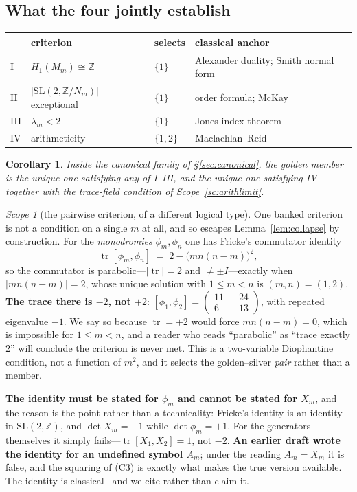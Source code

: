 \documentclass[11pt,reqno]{amsart}
\theoremstyle{plain}
\newtheorem{corollary}[theorem]{Corollary}
\theoremstyle{definition}
\theoremstyle{remark}
\newtheorem{scope}[theorem]{Scope}
\newcommand{\Z}{\mathbb{Z}}
\newcommand{\SL}{\mathrm{SL}}
\begin{document}
\subsection{What the four jointly establish}

\begin{table}[h]
\centering\small
\begin{tabular}{@{}llll@{}}
\toprule
 & criterion & selects & classical anchor\\
\midrule
I   & $H_1(M_m)\cong\Z$ & $\{1\}$ & Alexander duality; Smith normal form\\
II  & $|\SL(2,\Z/N_m)|$ exceptional & $\{1\}$ & order formula; McKay\\
III & $\lambda_m<2$ & $\{1\}$ & Jones index theorem\\
IV  & arithmeticity & $\{1,2\}$ & Maclachlan--Reid\\
\bottomrule
\end{tabular}
\end{table}

\begin{corollary}\label{cor:four}
Inside the canonical family of \S\ref{sec:canonical}, the golden member is the unique
one satisfying any of I--III, and the unique one satisfying IV together with the
trace-field condition of Scope~\ref{sc:arithlimit}.
\end{corollary}

\begin{scope}[the pairwise criterion, of a different logical type]\label{sc:pairwise}
One banked criterion is not a condition on a single $m$ at all, and so escapes
Lemma~\ref{lem:collapse} by construction. For the \emph{monodromies} $\phi_m,\phi_n$ one
has Fricke's commutator identity
\[
   \operatorname{tr}[\phi_m,\phi_n]\;=\;2-\bigl(mn(n-m)\bigr)^2 ,
\]
so the commutator is parabolic---$|\!\operatorname{tr}|=2$ and $\ne\pm I$---exactly when
$|mn(n-m)|=2$, whose unique solution with $1\le m<n$ is $(m,n)=(1,2)$. \textbf{The trace
there is $-2$, not $+2$}: $[\phi_1,\phi_2]=\left(\begin{smallmatrix}11&-24\\6&-13\end{smallmatrix}\right)$,
with repeated eigenvalue $-1$. We say so because $\operatorname{tr}=+2$ would force
$mn(n-m)=0$, which is impossible for $1\le m<n$, and a reader who reads ``parabolic'' as
``trace exactly $2$'' will conclude the criterion is never met. This is a two-variable Diophantine condition, not a
function of $m^2$, and it selects the golden--silver \emph{pair} rather than a member.

\textbf{The identity must be stated for $\phi_m$ and cannot be stated for $X_m$}, and the
reason is the point rather than a technicality: Fricke's identity is an identity in
$\SL(2,\Z)$, and $\det X_m=-1$ while $\det\phi_m=+1$. For the generators themselves it
simply fails---$\operatorname{tr}[X_1,X_2]=1$, not $-2$. \textbf{An earlier draft wrote
the identity for an undefined symbol $A_m$}; under the reading $A_m=X_m$ it is false, and
the squaring of (C3) is exactly what makes the true version available. The identity is classical~\cite{Fricke,Cohn} and we cite rather than claim it.
\end{scope}
\end{document}
